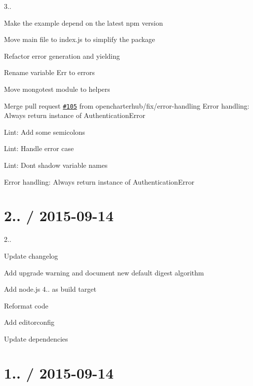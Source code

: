 \begin{DoxyItemize}
\item 3..
\item Make the example depend on the latest npm version
\item Move main file to index.\+js to simplify the package
\item Refactor error generation and yielding
\item Rename variable Err to errors
\item Move mongotest module to helpers
\item Merge pull request \href{https://github.com/saintedlama/passport-local-mongoose/issues/105}{\tt \#105} from opencharterhub/fix/error-\/handling Error handling\+: Always return instance of \textquotesingle{}Authentication\+Error\textquotesingle{}
\item Lint\+: Add some semicolons
\item Lint\+: Handle error case
\item Lint\+: Don\textquotesingle{}t shadow variable names
\item Error handling\+: Always return instance of \textquotesingle{}Authentication\+Error\textquotesingle{}
\end{DoxyItemize}

\section*{2.. / 2015-\/09-\/14 }


\begin{DoxyItemize}
\item 2..
\item Update changelog
\item Add upgrade warning and document new default digest algorithm
\item Add node.\+js 4.. as build target
\item Reformat code
\item Add editorconfig
\item Update dependencies
\end{DoxyItemize}

\section*{1.. / 2015-\/09-\/14 }


